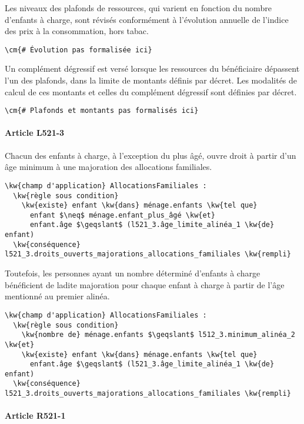 \documentclass[12pt, french]{article}
\providecommand{\cm}[1]{\textit{\texttt{\textcolor{PineGreen}{#1}}}}
\newcommand{\kw}[1]{\textbf{\textcolor{OliveGreen}{#1}}}
\begin{document}
Les niveaux des plafonds de ressources, qui varient en fonction du nombre d'enfants à charge, sont révisés conformément à l'évolution annuelle de l'indice des prix à la consommation, hors tabac.

\begin{Verbatim}
\cm{# Évolution pas formalisée ici}
\end{Verbatim}

Un complément dégressif est versé lorsque les ressources du bénéficiaire dépassent l'un des plafonds, dans la limite de montants définis par décret. Les modalités de calcul de ces montants et celles du complément dégressif sont définies par décret.

\begin{Verbatim}
\cm{# Plafonds et montants pas formalisés ici}
\end{Verbatim}

\paragraph{Article L521-3}

Chacun des enfants à charge, à l'exception du plus âgé, ouvre droit à partir d'un âge minimum à une majoration des allocations familiales.

\begin{Verbatim}
\kw{champ d'application} AllocationsFamiliales :
  \kw{règle sous condition}
    \kw{existe} enfant \kw{dans} ménage.enfants \kw{tel que}
      enfant $\neq$ ménage.enfant_plus_âgé \kw{et}
      enfant.âge $\geqslant$ (l521_3.âge_limite_alinéa_1 \kw{de} enfant)
  \kw{conséquence} l521_3.droits_ouverts_majorations_allocations_familiales \kw{rempli}
\end{Verbatim}


Toutefois, les personnes ayant un nombre déterminé d'enfants à charge bénéficient de ladite majoration pour chaque enfant à charge à partir de l'âge mentionné au premier alinéa.

\begin{Verbatim}
\kw{champ d'application} AllocationsFamiliales :
  \kw{règle sous condition}
    \kw{nombre de} ménage.enfants $\geqslant$ l512_3.minimum_alinéa_2 \kw{et}
    \kw{existe} enfant \kw{dans} ménage.enfants \kw{tel que}
      enfant.âge $\geqslant$ (l521_3.âge_limite_alinéa_1 \kw{de} enfant)
  \kw{conséquence} l521_3.droits_ouverts_majorations_allocations_familiales \kw{rempli}
\end{Verbatim}

\paragraph{Article R521-1}
\end{document}

